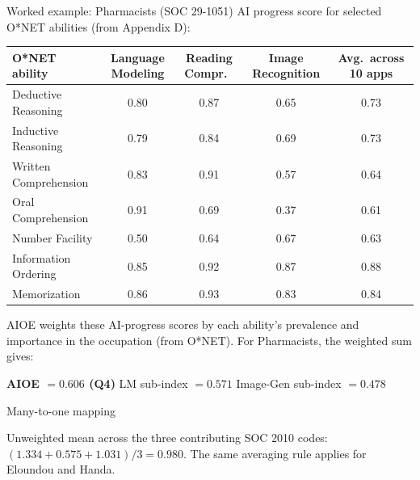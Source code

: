 \begin{frame}{Worked example: Pharmacists (SOC 29-1051)}
\centering\scriptsize
AI progress score for selected O*NET abilities (from Appendix D):

\vspace{0.4em}
\begin{tabular}{lcccc}
\toprule
O*NET ability & Language Modeling & Reading Compr.\ & Image Recognition & Avg.\ across 10 apps \\
\midrule
Deductive Reasoning      & 0.80 & 0.87 & 0.65 & 0.73 \\
Inductive Reasoning      & 0.79 & 0.84 & 0.69 & 0.73 \\
Written Comprehension    & 0.83 & 0.91 & 0.57 & 0.64 \\
Oral Comprehension       & 0.91 & 0.69 & 0.37 & 0.61 \\
Number Facility          & 0.50 & 0.64 & 0.67 & 0.63 \\
Information Ordering     & 0.85 & 0.92 & 0.87 & 0.88 \\
Memorization             & 0.86 & 0.93 & 0.83 & 0.84 \\
\bottomrule
\end{tabular}

\vspace{0.5em}
\justifying\small
AIOE weights these AI-progress scores by each ability's prevalence and importance in the occupation (from O*NET). For Pharmacists, the weighted sum gives:

\vspace{0.4em}
\centering
\textbf{AIOE $= 0.606$ (Q4)} \quad LM sub-index $= 0.571$ \quad Image-Gen sub-index $= 0.478$
\end{frame}

\begin{frame}{Many-to-one mapping}
\centering
{}

\vspace{0.6em}
Unweighted mean across the three contributing SOC 2010 codes: $(1.334 + 0.575 + 1.031)/3 = 0.980$. The same averaging rule applies for Eloundou and Handa.
\end{frame}
